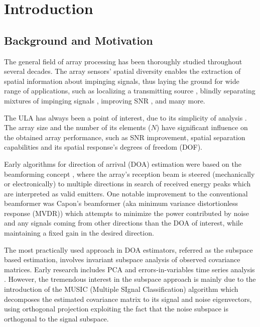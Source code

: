 \chapter{Introduction}
\label{chap:intro}
\section{Background and Motivation}
The general field of array processing has been thoroughly studied throughout several decades.
The array sensors' spatial diversity enables the extraction of spatial information about impinging signals, thus laying the ground for wide range of applications, such as localizing a transmitting source \cite{skolnik2008radar,long2019}, blindly separating mixtures of impinging signals \cite{comon1994independent}, improving SNR \cite{verdu1998multiuser}, and many more. 
\par The ULA has always been a point of interest, due to its simplicity of analysis \cite{van2004optimum,benesty2018}. 
The array size and the number of its elements ($N$) have significant influence on the obtained array performance, such as SNR improvement, spatial separation capabilities and its spatial response's degrees of freedom (DOF).
\par Early algorithms for direction of arrival (DOA) estimation were based on the beamforming concept \cite{krim1996two}, where the array's reception beam is steered (mechanically or electronically) to multiple directions in search of received energy peaks which are interpreted as valid emitters.
One notable improvement to the conventional beamformer \cite{van2004optimum} was Capon's beamformer  (aka minimum variance distortionless response (MVDR)) which attempts to minimize the power contributed by noise and any signals coming from other directions than the DOA of interest, while maintaining a fixed gain
in the desired direction.
\par The most practically used approach in DOA estimators, referred as the subspace based estimation, involves invariant subspace analysis of observed covariance matrices.
Early research includes PCA and errors-in-variables time series analysis \cite{krim1996two}.
However, the tremendous interest in the subspace approach is mainly due to the introduction of the
MUSIC (Multiple SIgnal Classification) algorithm \cite{schmidt1986multiple} which decomposes the estimated covariance matrix to its signal and noise eigenvectors, using orthogonal projection exploiting the fact that the noise subspace is orthogonal to the signal subspace.
